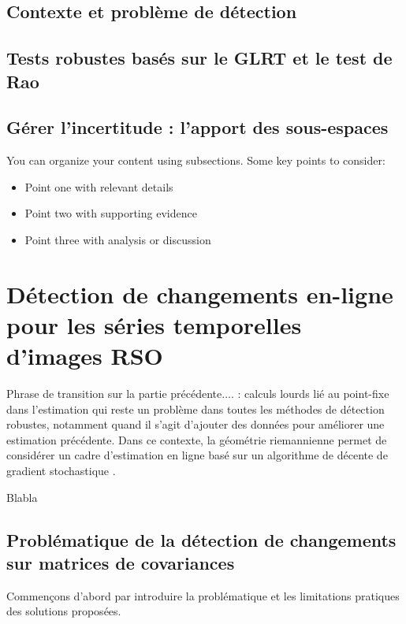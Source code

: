 \subsection{Contexte et problème de détection}


\subsection{Tests robustes basés sur le GLRT et le test de Rao}


\subsection{Gérer l'incertitude : l'apport des sous-espaces}

You can organize your content using subsections. Some key points to consider:

\begin{itemize}
    \item Point one with relevant details
    \item Point two with supporting evidence
    \item Point three with analysis or discussion
\end{itemize}

\newpage

\section{Détection de changements en-ligne pour les séries temporelles d'images RSO}
\label{sec:detection-online-change-detection}


Phrase de transition sur la partie précédente.... : calculs lourds lié au point-fixe dans l'estimation qui reste un problème dans toutes les méthodes de détection robustes, notamment quand il s'agit d'ajouter des données pour améliorer une estimation précédente. Dans ce contexte, la géométrie riemannienne permet de considérer un cadre d'estimation en ligne basé sur un algorithme de décente de gradient stochastique \cite{Zhou_2019}.

Blabla


\subsection{Problématique de la détection de changements sur matrices de covariances}

Commençons d'abord par introduire la problématique et les limitations pratiques des solutions proposées.

